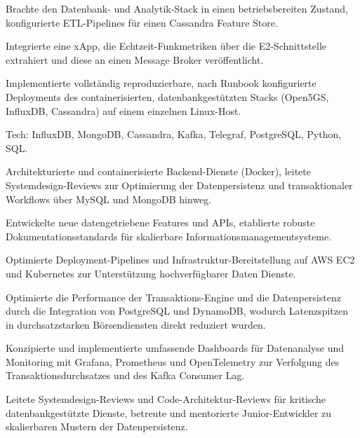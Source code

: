 \documentclass[10pt,a4paper]{resume}
\begin{document}
\bullets
  \item Brachte den Datenbank- und Analytik-Stack in einen betriebsbereiten Zustand, konfigurierte ETL-Pipelines für einen Cassandra Feature Store.
  \item Integrierte eine xApp, die Echtzeit-Funkmetriken über die E2-Schnittstelle extrahiert und diese an einen Message Broker veröffentlicht.
  \item Implementierte vollständig reproduzierbare, nach Runbook konfigurierte Deployments des containerisierten, datenbankgestützten Stacks (Open5GS, InfluxDB, Cassandra) auf einem einzelnen Linux-Host.
  \item Tech: InfluxDB, MongoDB, Cassandra, Kafka, Telegraf, PostgreSQL, Python, SQL.
\bulletsend
\vspace{1.5pt}
\bullets
  \item Architekturierte und containerisierte Backend-Dienste (Docker), leitete Systemdesign-Reviews zur Optimierung der Datenpersistenz und transaktionaler Workflows über MySQL und MongoDB hinweg.
  \item Entwickelte neue datengetriebene Features und APIs, etablierte robuste Dokumentationsstandards für skalierbare Informationsmanagementsysteme.
  \item Optimierte Deployment-Pipelines und Infrastruktur-Bereitstellung auf AWS EC2 und Kubernetes zur Unterstützung hochverfügbarer Daten Dienste.
\bulletsend
\vspace{1.5pt}
\bullets
  \item Optimierte die Performance der Transaktions-Engine und die Datenpersistenz durch die Integration von PostgreSQL und DynamoDB, wodurch Latenzspitzen in durchsatzstarken Börsendiensten direkt reduziert wurden.
  \item Konzipierte und implementierte umfassende Dashboards für Datenanalyse und Monitoring mit Grafana, Prometheus und OpenTelemetry zur Verfolgung des Transaktionsdurchsatzes und des Kafka Consumer Lag.
  \item Leitete Systemdesign-Reviews und Code-Architektur-Reviews für kritische datenbankgestützte Dienste, betreute und mentorierte Junior-Entwickler zu skalierbaren Mustern der Datenpersistenz.
\bulletsend
\vspace{1.5pt}
\end{document}
